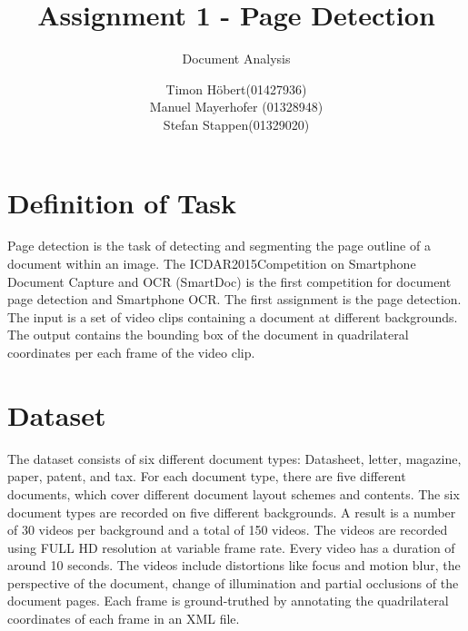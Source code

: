 \documentclass[english, paper=a4]{scrartcl}
\begin{document}
\graphicspath{{images/}}


\title{Assignment 1 - Page Detection} 

\subtitle{Document Analysis} 

\author{Timon Höbert(01427936) \\ Manuel Mayerhofer (01328948)\\ Stefan Stappen(01329020)}




\maketitle



\section{Definition of Task}
Page detection is the task of detecting and segmenting the page outline of a document within an image. The ICDAR2015Competition on Smartphone Document Capture and OCR (SmartDoc) \cite{burie2015icdar2015} is the first competition for document page detection and Smartphone OCR. The first assignment is the page detection.\\
The input is a set of video clips containing a document at different backgrounds. The output contains the bounding box of the document in quadrilateral coordinates per each frame of the video clip.

\section{Dataset}
The dataset consists of six different document types: Datasheet, letter, magazine, paper, patent, and tax.
For each document type, there are five different documents, which cover different document layout schemes and contents.
The six document types are recorded on five different backgrounds. A result is a number of 30 videos per background and a total of 150 videos. The videos are recorded using FULL HD resolution at variable frame rate.  
Every video has a duration of around 10 seconds. The videos include distortions like focus and motion blur, the perspective of the document, change of illumination and partial occlusions of the document pages. Each frame is ground-truthed by annotating the quadrilateral coordinates of each frame in an XML file.
\end{document}
